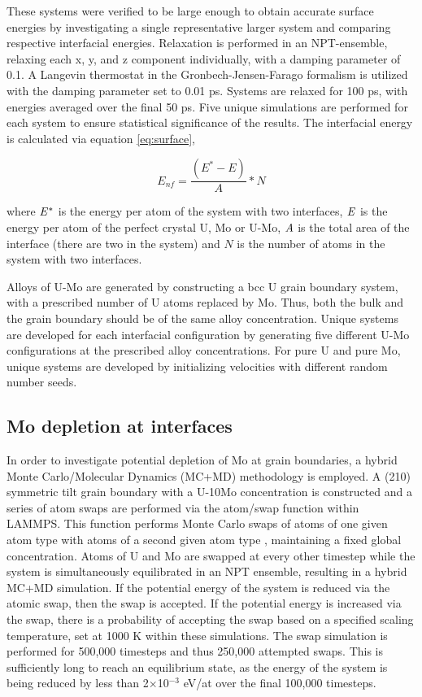 \documentclass[review]{elsarticle}
\begin{document}
These systems were verified to be large enough to obtain accurate surface energies by investigating a single representative larger system and comparing respective interfacial energies. Relaxation is performed in an NPT-ensemble, relaxing each x, y, and z component individually, with a damping parameter of 0.1. A Langevin thermostat in the Gronbech-Jensen-Farago \cite{gjf2014} formalism is utilized with the damping parameter set to 0.01 ps. Systems are relaxed for 100 ps, with energies averaged over the final 50 ps. Five unique simulations are performed for each system to ensure statistical significance of the results. The interfacial energy is calculated via equation \ref{eq:surface},

\begin{equation}
\label{eq:surface}
E_{nf}= \frac{(E^{*} - E)}{A} * N
\end{equation}

where $\it{E^{*}}$ is the energy per atom of the system with two interfaces, $\it{E}$ is the energy per atom of the perfect crystal U, Mo or U-Mo, $\it{A}$ is the total area of the interface (there are two in the system) and $\textit{N}$ is the number of atoms in the system with two interfaces. 

Alloys of U-Mo are generated by constructing a bcc U grain boundary system, with a prescribed number of U atoms replaced by Mo. Thus, both the bulk and the grain boundary should be of the same alloy concentration. Unique systems are developed for each interfacial configuration by generating five different U-Mo configurations at the prescribed alloy concentrations. For pure U and pure Mo, unique systems are developed by initializing velocities with different random number seeds. 

\subsection{Mo depletion at interfaces}

In order to investigate potential depletion of Mo at grain boundaries, a hybrid Monte Carlo/Molecular Dynamics (MC+MD) methodology is employed. A (210) symmetric tilt grain boundary with a U-10Mo concentration is constructed and a series of atom swaps are performed via the atom/swap function within LAMMPS. This function performs Monte Carlo swaps of atoms of one given atom type with atoms of a second given atom type \cite{plimpton1995}, maintaining a fixed global concentration. Atoms of U and Mo are swapped at every other timestep while the system is simultaneously equilibrated in an NPT ensemble, resulting in a hybrid MC+MD simulation. If the potential energy of the system is reduced via the atomic swap, then the swap is accepted. If the potential energy is increased via the swap, there is a probability of accepting the swap based on a specified scaling temperature, set at 1000 K within these simulations. The swap simulation is performed for 500,000 timesteps and thus 250,000 attempted swaps. This is sufficiently long to reach an equilibrium state, as the energy of the system is being reduced by less than 2$\times$10$^{-3}$ eV/at over the final 100,000 timesteps.
\end{document}
